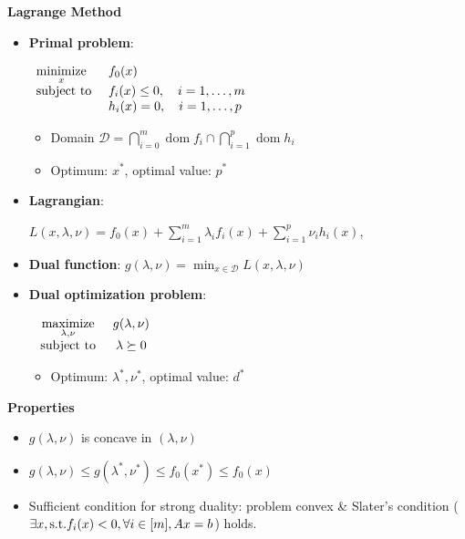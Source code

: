 {\LARGE \textbf{Lagrange Method}}


\begin{itemize}
    \item \textbf{Primal problem}:
    
$\begin{array}{*{20}{l}}
{\mathop {{\mathop{\rm minimize}\nolimits} }\limits_x }&{{f_0}(x)}\\
{{\text{subject to }}}&{{f_i}(x) \le 0,\quad i = 1, \ldots ,m}\\
{}&{{h_i}(x) = 0,\quad i = 1, \ldots ,p}
\end{array}$
    \begin{itemize}
        \item Domain $\mathcal{D}=\bigcap_{i=0}^{m} \operatorname{dom} f_{i} \cap \bigcap_{i=1}^{p} \operatorname{dom} h_{i}$
        \item Optimum: $x^*$, optimal value: $p^*$
    \end{itemize}
    
    \item \textbf{Lagrangian}: 
    
    $L(x, \lambda, \nu)=f_{0}(x)+\sum_{i=1}^{m} \lambda_{i} f_{i}(x)+\sum_{i=1}^{p} \nu_{i} h_{i}(x)$,
    
    \item \textbf{Dual function}:
        $g(\lambda, \nu)=\min _{x \in \mathcal{D}} L(x, \lambda, \nu)$
    
    \item \textbf{Dual optimization problem}:
    
$\begin{array}{*{20}{c}}
{\mathop {{\mathop{\rm maximize}\nolimits} }\limits_{\lambda ,\nu } }&{g(\lambda ,\nu )}\\
{{\text{ subject to }}}&{\lambda \succeq 0}
\end{array}$
    
    \begin{itemize}
        \item Optimum: $\lambda^*, \nu^*$, optimal value: $d^*$
    \end{itemize}    

\end{itemize}

\textbf{Properties}

\begin{itemize}
    \item $g(\lambda ,\nu )$ is concave in $(\lambda ,\nu )$
    \item $g(\lambda ,\nu ) \le g({\lambda ^*},{\nu ^*}) \le {f_0}({x^*}) \le {f_0}(x)$
    \item Sufficient condition for strong duality: problem convex \& Slater's condition ($\exists x,{\rm{s}}{\rm{.t}}{\rm{.}}{f_i}(x) < 0,\forall i \in [m],Ax = b$) holds.
\end{itemize}
